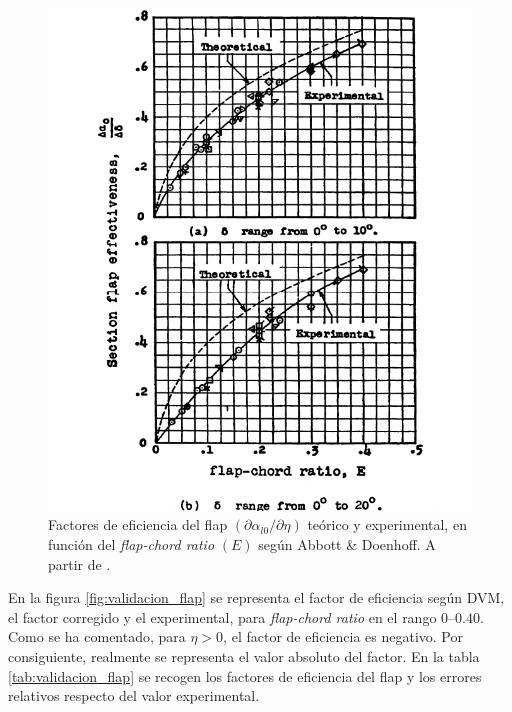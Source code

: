 \begin{figure}[ht] 
    \centering
    \includegraphics[width=\linewidth]{imagenes/validacion/validacion_abbot_flap.pdf}
    \caption{Factores de eficiencia del flap $\left( \partial \alpha_{l0} / \partial \eta \right)$ teórico y experimental, en función del \emph{flap-chord ratio} $\left( E \right)$ según Abbott \& Doenhoff. A partir de \cite{abbott_flap}.}
    \label{fig:validacion_abbot_flap}
\end{figure}

En la figura \ref{fig:validacion_flap} se representa el factor de eficiencia según DVM, el factor corregido y el experimental, para \emph{flap-chord ratio} en el rango $0$--$0.40$. Como se ha comentado, para $\eta > 0$, el factor de eficiencia es negativo. Por consiguiente, realmente se representa el valor absoluto del factor. En la tabla \ref{tab:validacion_flap} se recogen los factores de eficiencia del flap y los errores relativos respecto del valor experimental.


